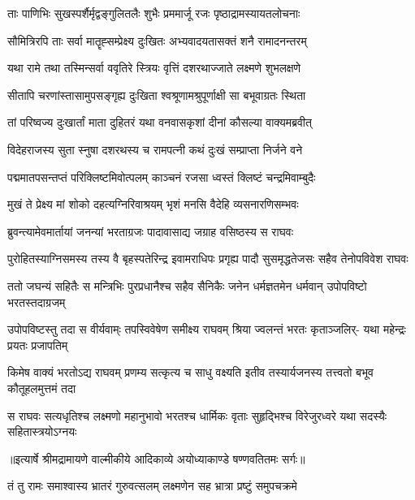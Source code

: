 \twolineshloka
{ताः पाणिभिः सुखस्पर्शैर्मृद्वङ्गुलितलैः शुभैः}
{प्रममार्जू रजः पृष्ठाद्रामस्यायतलोचनाः} %

\twolineshloka
{सौमित्रिरपि ताः सर्वा मातॄह्सम्प्रेक्ष्य दुःखितः}
{अभ्यवादयतासक्तं शनै रामादनन्तरम्} %

\twolineshloka
{यथा रामे तथा तस्मिन्सर्वा ववृतिरे स्त्रियः}
{वृत्तिं दशरथाज्जाते लक्ष्मणे शुभलक्षणे} %

\twolineshloka
{सीतापि चरणांस्तासामुपसङ्गृह्य दुःखिता}
{श्वश्रूणामश्रुपूर्णाक्षी सा बभूवाग्रतः स्थिता} %

\twolineshloka
{तां परिष्वज्य दुःखार्तां माता दुहितरं यथा}
{वनवासकृशां दीनां कौसल्या वाक्यमब्रवीत्} %

\twolineshloka
{विदेहराजस्य सुता स्नुषा दशरथस्य च}
{रामपत्नी कथं दुःखं सम्प्राप्ता निर्जने वने} %

\twolineshloka
{पद्ममातपसन्तप्तं परिक्लिष्टमिवोत्पलम्}
{काञ्चनं रजसा ध्वस्तं क्लिष्टं चन्द्रमिवाम्बुदैः} %

\twolineshloka
{मुखं ते प्रेक्ष्य मां शोको दहत्यग्निरिवाश्रयम्}
{भृशं मनसि वैदेहि व्यसनारणिसम्भवः} %

\twolineshloka
{ब्रुवन्त्यामेवमार्तायां जनन्यां भरताग्रजः}
{पादावासाद्य जग्राह वसिष्ठस्य स राघवः} %

\fourlineindentedshloka
{पुरोहितस्याग्निसमस्य तस्य वै}
{बृहस्पतेरिन्द्र इवामराधिपः}
{प्रगृह्य पादौ सुसमृद्धतेजसः}
{सहैव तेनोपविवेश राघवः} %

\fourlineindentedshloka
{ततो जघन्यं सहितैः स मन्त्रिभिः}
{पुरप्रधानैश्च सहैव सैनिकैः}
{जनेन धर्मज्ञतमेन धर्मवान्}
{उपोपविष्टो भरतस्तदाग्रजम्} %

\fourlineindentedshloka
{उपोपविष्टस्तु तदा स वीर्यवाम्ः}
{तपस्विवेषेण समीक्ष्य राघवम्}
{श्रिया ज्वलन्तं भरतः कृताञ्जलिर्-}
{यथा महेन्द्रः प्रयतः प्रजापतिम्} %

\fourlineindentedshloka
{किमेष वाक्यं भरतोऽद्य राघवम्}
{प्रणम्य सत्कृत्य च साधु वक्ष्यति}
{इतीव तस्यार्यजनस्य तत्त्वतो}
{बभूव कौतूहलमुत्तमं तदा} %

\fourlineindentedshloka
{स राघवः सत्यधृतिश्च लक्ष्मणो}
{महानुभावो भरतश्च धार्मिकः}
{वृताः सुहृद्भिश्च विरेजुरध्वरे}
{यथा सदस्यैः सहितास्त्रयोऽग्नयः} %


{॥इत्यार्षे श्रीमद्रामायणे वाल्मीकीये आदिकाव्ये अयोध्याकाण्डे षण्णवतितमः सर्गः॥}


\twolineshloka
{तं तु रामः समाश्वास्य भ्रातरं गुरुवत्सलम्}
{लक्ष्मणेन सह भ्रात्रा प्रष्टुं समुपचक्रमे} %

